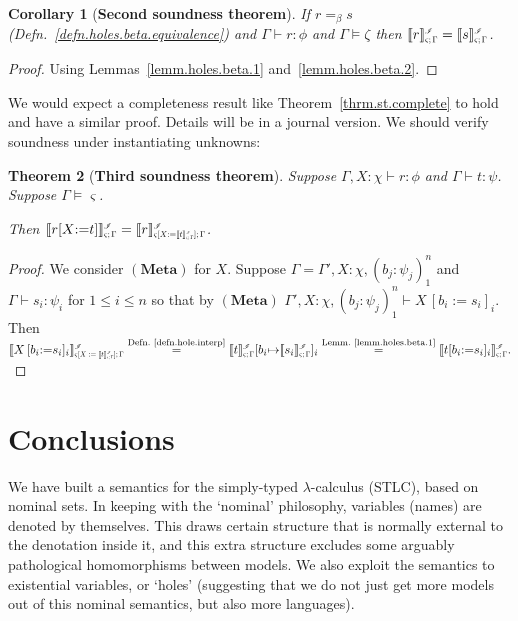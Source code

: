 \documentclass[submission,copyright]{eptcs}
\newtheorem{thrm}{Theorem}[section]
\newtheorem{corr}[thrm]{Corollary}
\newcommand{\beq}{=_{\scriptstyle{\beta}}}
\newcommand{\rulefont}[1]{\ensuremath{(\mathbf{#1})}}
\newcommand{\sm}{\mapsto}
\newcommand{\ssm}{:=}
\newcommand\den[1]{{\hspace{.00ex}\scalebox{.55}{$#1$}}}
\newcommand{\idenot}[2]{\denot{\interp I}{#1}{#2}}
\newcommand\interp[1]{\ensuremath{\mathscr #1}}
\newcommand{\denot}[3]{\llbracket #3 \rrbracket_{\scalebox{.6}{$#2$}}^\den{#1}} \newcommand{\hdenot}[1]{\denot{\interp H}{}{#1}}
\newcommand\cent{\vdash}
\newcommand\ment{\vDash}
\begin{document}
\begin{corr}[\bf Second soundness theorem]
If $r\beq s$ (Defn.~\ref{defn.holes.beta.equivalence}) and $\Gamma\cent r:\phi$ and $\Gamma\models\zeta$ then $\idenot{\varsigma;\Gamma}{r}=\idenot{\varsigma;\Gamma}{s}$.
\end{corr}
\begin{proof}
Using Lemmas~\ref{lemm.holes.beta.1} and~\ref{lemm.holes.beta.2}.
\end{proof}

We would expect a completeness result like Theorem~\ref{thrm.st.complete} to hold and have a similar proof.
Details will be in a journal version.
We should verify soundness under instantiating unknowns:
 


\begin{thrm}[\bf Third soundness theorem]
Suppose $\Gamma,X{:}\chi\cent r:\phi$ and $\Gamma\cent t:\psi$.
Suppose $\Gamma\ment\varsigma$.

Then $\idenot{\varsigma;\Gamma}{r[X{\ssm} t]}=\idenot{\varsigma[X{\ssm}\idenot{\varsigma;\Gamma}{t}];\Gamma}{r}$.
\end{thrm}
\begin{proof}
We consider \rulefont{Meta} for $X$.
Suppose $\Gamma=\Gamma',X{:}\chi,(b_j{:}\psi_j)_1^n$ and $\Gamma\cent s_i{:}\psi_i$ for $1{\leq}i{\leq}n$ so that by \rulefont{Meta} $\Gamma',X{:}\chi,(b_j{:}\psi_j)_1^n\cent X\,[b_i{\ssm}s_i]_i$.
Then
$
\idenot{\varsigma[X\ssm \idenot{\varsigma;\Gamma}{t}];\Gamma}{X\,[b_i{\ssm}s_i]_i}
\stackrel{\text{Defn.~\ref{defn.hole.interp}}}{=}
\idenot{\varsigma;\Gamma}{t}[b_i{\sm}\idenot{\varsigma;\Gamma}{s_i}]_i
\stackrel{\text{Lemm.~\ref{lemm.holes.beta.1}}}{=}
\idenot{\varsigma;\Gamma}{t[b_i{\ssm}s_i]_i} . 
$
\end{proof}


\section{Conclusions}

We have built a semantics for the simply-typed $\lambda$-calculus (STLC), based on nominal sets.
In keeping with the `nominal' philosophy, variables (names) are denoted by themselves. 
This draws certain structure that is normally external to the denotation inside it, and this extra structure excludes some arguably pathological homomorphisms between models. 
We also exploit the semantics to existential variables, or `holes' (suggesting that we do not just get more models out of this nominal semantics, but also more languages).
\end{document}
